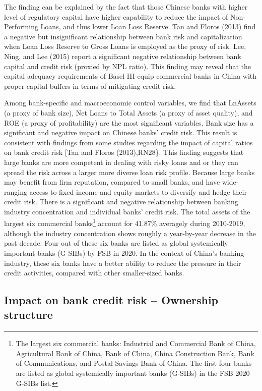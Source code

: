 \documentclass{article}
\begin{document}
The finding can be explained by the fact that those Chinese banks with
higher level of regulatory capital have higher capability to reduce the
impact of Non-Performing Loans, and thus lower Loan Loss Reserve. Tan
and Floros (2013) find a negative but insignificant relationship between
bank risk and capitalization when Loan Loss Reserve to Gross Loans is
employed as the proxy of risk. Lee, Ning, and Lee (2015) report a
significant negative relationship between bank capital and credit risk
(proxied by NPL ratio). This finding may reveal that the capital
adequacy requirements of Basel III equip commercial banks in China with
proper capital buffers in terms of mitigating credit risk.

Among bank-specific and macroeconomic control variables, we find that
LnAssets (a proxy of bank size), Net Loans to Total Assets (a proxy of
asset quality), and ROE (a proxy of profitability) are the most
significant variables. Bank size has a significant and negative impact
on Chinese banks' credit risk. This result is consistent with findings
from some studies regarding the impact of capital ratios on bank credit
risk {[}Tan and Floros (2013),RN28\}. This finding suggests that large
banks are more competent in dealing with risky loans and or they can
spread the risk across a larger more diverse loan risk profile. Because
large banks may benefit from firm reputation, compared to small banks,
and have wide-ranging access to fixed-income and equity markets to
diversify and hedge their credit risk. There is a significant and
negative relationship between banking industry concentration and
individual banks' credit risk. The total assets of the largest six
commercial banks\footnote{The largest six commercial banks: Industrial
  and Commercial Bank of China, Agricultural Bank of China, Bank of
  China, China Construction Bank, Bank of Communications, and Postal
  Savings Bank of China. The first four banks are listed as global
  systemically important banks (G-SIBs) in the FSB 2020 G-SIBs list.}
account for 41.87\% averagely during 2010-2019, although the industry
concentration shows roughly a year-by-year decrease in the past decade.
Four out of these six banks are listed as global systemically important
banks (G-SIBs) by FSB in 2020. In the context of China's banking
industry, these six banks have a better ability to reduce the pressure
in their credit activities, compared with other smaller-sized banks.

\hypertarget{impact-on-bank-credit-risk-ownership-structure}{%
\subsection{Impact on bank credit risk -- Ownership
structure}\label{impact-on-bank-credit-risk-ownership-structure}}
\end{document}
